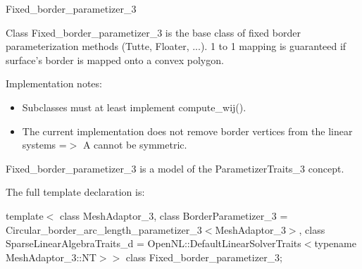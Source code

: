 

\begin{ccRefClass}{Fixed_border_parametizer_3}  %


\ccDefinition


Class Fixed\_border\_parametizer\_3 is the base class of fixed border parameterization methods (Tutte, Floater, ...). 1 to 1 mapping is guaranteed if surface's border is mapped onto a convex polygon.

Implementation notes:\begin{itemize}
\item Subclasses must at least implement compute\_wij().\item The current implementation does not remove border vertices from the linear systems =$>$ A cannot be symmetric.\end{itemize}




\ccIsModel

Fixed\_border\_parametizer\_3 is a model of the ParametizerTraits\_3 concept.



\ccParameters

The full template declaration is:

template$<$
class MeshAdaptor\_3, 
class BorderParametizer\_3 = Circular\_border\_arc\_length\_parametizer\_3$<$MeshAdaptor\_3$>$, 
class SparseLinearAlgebraTraits\_d = OpenNL::DefaultLinearSolverTraits$<$typename MeshAdaptor\_3::NT$>$$>$ 
class Fixed\_border\_parametizer\_3;


\ccTypes



\end{ccRefClass}
